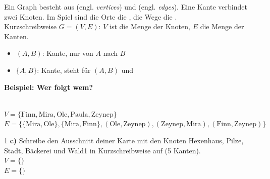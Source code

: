 \documentclass[11pt,a4paper]{article}
\begin{document}
\begin{minipage}[t]{0.6\linewidth}
\begin{merke}[Graph und Kurzschreibweise $G = (V, E)$]\raggedright
Ein Graph besteht aus  (engl. \textit{vertices}) und  (engl. \textit{edges}). Eine Kante verbindet zwei Knoten. Im Spiel sind die Orte die , die Wege die .\\[1mm]
Kurzschreibweise $G = (V, E)$: $V$ ist die Menge der Knoten, $E$ die Menge der Kanten.
\begin{itemize}
\item $(A, B)$:  Kante, nur von $A$ nach $B$
\item $\{A, B\}$:  Kante, steht für $(A, B)$ und 
\end{itemize}
\end{merke}
\end{minipage}\hfill
\begin{minipage}[t]{0.37\linewidth}
\vspace{1mm}
\centering\small \textbf{Beispiel: Wer folgt wem?}\\[1mm]
\end{minipage}\\[1mm]
{\small $V = \{\text{Finn}, \text{Mira}, \text{Ole}, \text{Paula}, \text{Zeynep}\}$\\
$E = \{\{\text{Mira}, \text{Ole}\}, \{\text{Mira}, \text{Finn}\}, (\text{Ole}, \text{Zeynep}), (\text{Zeynep}, \text{Mira}), (\text{Finn}, \text{Zeynep})\}$}

\begin{aufgabe}{1}
\textbf{c)} Schreibe den Ausschnitt deiner Karte mit den Knoten Hexenhaus, Pilze, Stadt, Bäckerei und Wald1 in Kurzschreibweise auf (5 Kanten).\\[2mm]
$V = \{$$\}$\\[3mm]
$E = \{$$\}$
\end{aufgabe}
\end{document}
